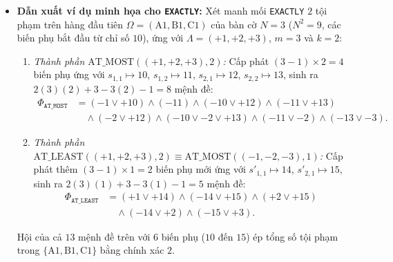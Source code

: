 \begin{itemize}
    \item \textbf{Dẫn xuất ví dụ minh họa cho \texttt{EXACTLY}:} Xét manh mối \texttt{EXACTLY} $2$ tội phạm trên hàng đầu tiên $\Omega = (\text{A1}, \text{B1}, \text{C1})$ của bàn cờ $N = 3$ ($N^2 = 9$, các biến phụ bắt đầu từ chỉ số $10$), ứng với $\Lambda = (+1, +2, +3)$, $m = 3$ và $k = 2$:
    \begin{enumerate}
        \item \textit{Thành phần $\text{AT\_MOST}((+1, +2, +3), 2)$:} Cấp phát $(3 - 1) \times 2 = 4$ biến phụ ứng với $s_{1,1} \mapsto 10$, $s_{1,2} \mapsto 11$, $s_{2,1} \mapsto 12$, $s_{2,2} \mapsto 13$, sinh ra $2(3)(2) + 3 - 3(2) - 1 = 8$ mệnh đề:
        \begin{align}
            \Phi_{\texttt{AT\_MOST}} &= (-1 \lor +10) \land (-11) \land (-10 \lor +12) \land (-11 \lor +13) \nonumber \\
            &\quad \land (-2 \lor +12) \land (-10 \lor -2 \lor +13) \land (-11 \lor -2) \land (-13 \lor -3).
        \end{align}
        \item \textit{Thành phần $\text{AT\_LEAST}((+1, +2, +3), 2) \equiv \text{AT\_MOST}((-1, -2, -3), 1)$:} Cấp phát thêm $(3 - 1) \times 1 = 2$ biến phụ mới ứng với $s'_{1,1} \mapsto 14$, $s'_{2,1} \mapsto 15$, sinh ra $2(3)(1) + 3 - 3(1) - 1 = 5$ mệnh đề:
        \begin{align}
            \Phi_{\texttt{AT\_LEAST}} &= (+1 \lor +14) \land (-14 \lor +15) \land (+2 \lor +15) \nonumber \\
            &\quad \land (-14 \lor +2) \land (-15 \lor +3).
        \end{align}
    \end{enumerate}
    Hội của cả $13$ mệnh đề trên với $6$ biến phụ ($10$ đến $15$) ép tổng số tội phạm trong $\{\text{A1}, \text{B1}, \text{C1}\}$ bằng chính xác $2$.
\end{itemize}
\newpage
